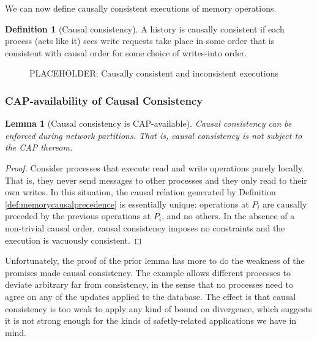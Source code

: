 \documentclass[]             %
{NASA}                       %
\newtheorem{lemma}[theorem]{Lemma}
\theoremstyle{definition}
\newtheorem{definition}{Definition}[section]
\begin{document}
We can now define causally consistent executions of memory operations.

\begin{definition}[Causal consistency]
  \label{def:causalconsistency}
  A history is causally consistent if each process (acts like it) sees
  write requests take place in some order that is consistent with
  causal order for some choice of writes-into order.
\end{definition}

\begin{figure}[p]
  \begin{subfigure}{1\textwidth}
    \centering
    
    \caption{}
    \label{fig:smEx1L1}
  \end{subfigure}

  \begin{subfigure}{1\textwidth}
    
    \caption{}
    \label{fig:smEx5}
  \end{subfigure}

  \caption{PLACEHOLDER: Causally consistent and inconsistent executions}
  \label{fig:smEx3}
\end{figure}

\afterpage{\clearpage}

\subsubsection{CAP-availability of Causal Consistency}
\label{the-cap-theorem}

\begin{lemma}[Causal consistency is CAP-available]
  \label{thm:cap-causal}
  Causal consistency can be enforced during network partitions. That
  is, causal consistency is not subject to the CAP thereom.
\end{lemma}
\begin{proof}
  Consider processes that execute read and write operations purely
  locally. That is, they never send messages to other processes and
  they only read to their own writes. In this situation, the causal
  relation generated by Definition \ref{def:memorycausalprecedence} is
  essentially unique: operations at $P_i$ are causally preceded by the
  previous operations at $P_i$, and no others. In the absence of a
  non-trivial causal order, causal consistency imposes no constraints
  and the execution is vacuously consistent.
\end{proof}

Unfortunately, the proof of the prior lemma has more to do the
weakness of the promises made causal consistency. The example allows
different processes to deviate arbitrary far from consistency, in the
sense that no processes need to agree on any of the updates applied to
the database. The effect is that causal consistency is too weak to
apply any kind of bound on divergence, which suggests it is not strong
enough for the kinds of safetly-related applications we have in mind.
\end{document}
